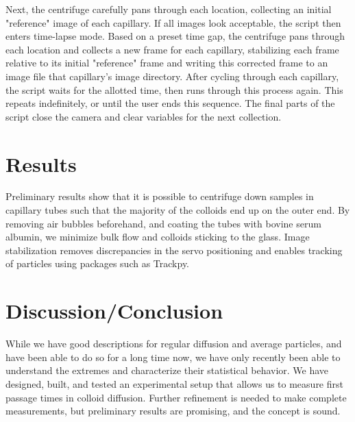Next, the centrifuge carefully pans through each location, collecting an initial "reference" image of each capillary. If all images look acceptable, the script then enters time-lapse mode. Based on a preset time gap, the centrifuge pans through each location and collects a new frame for each capillary, stabilizing each frame relative to its initial "reference" frame and writing this corrected frame to an image file that capillary's image directory. After cycling through each capillary, the script waits for the allotted time, then runs through this process again. This repeats indefinitely, or until the user ends this sequence. The final parts of the script close the camera and clear variables for the next collection.
 
\section{Results}
Preliminary results show that it is possible to centrifuge down samples in capillary tubes such that the majority of the colloids end up on the outer end. By removing air bubbles beforehand, and coating the tubes with bovine serum albumin, we minimize bulk flow and colloids sticking to the glass. Image stabilization removes discrepancies in the servo positioning and enables tracking of particles using packages such as Trackpy.

\section{Discussion/Conclusion}
While we have good descriptions for regular diffusion and average particles, and have been able to do so for a long time now, we have only recently been able to understand the extremes and characterize their statistical behavior. We have designed, built, and tested an experimental setup that allows us to measure first passage times in colloid diffusion. Further refinement is needed to make complete measurements, but preliminary results are promising, and the concept is sound.



%
%

